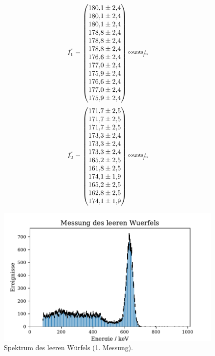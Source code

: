 \begin{equation}
	\vec{I_1}=
	\begin{pmatrix}
		\num{180.1 \pm 2.4} \\
		\num{180.1 \pm 2.4} \\
		\num{180.1\pm 2.4} \\
		\num{178.8\pm 2.4} \\
		\num{178.8\pm 2.4} \\
		\num{178.8\pm 2.4} \\
		\num{176.6\pm 2.4} \\
		\num{177.0\pm 2.4} \\
		\num{175.9\pm 2.4} \\
    \num{176.6\pm 2.4} \\
    \num{177.0\pm 2.4} \\
    \num{175.9\pm 2.4} \\
	\end{pmatrix}
    \sfrac{\text{counts}}{\text{s}}
	\label{eq:vecleer1}
\end{equation}
\begin{equation}
	\vec{I_2}=
	\begin{pmatrix}
		\num{171.7 \pm 2.5} \\
		\num{171.7 \pm 2.5} \\
		\num{171.7\pm 2.5} \\
		\num{173.3\pm 2.4} \\
		\num{173.3\pm 2.4} \\
		\num{173.3\pm 2.4} \\
		\num{165.2\pm 2.5} \\
		\num{161.8\pm 2.5} \\
		\num{174.1\pm 1.9} \\
    \num{165.2\pm 2.5} \\
    \num{162.8\pm 2.5} \\
    \num{174.1\pm 1.9} \\
	\end{pmatrix}
    \sfrac{\text{counts}}{\text{s}}
	\label{eq:vecleer2}
\end{equation}
\begin{figure}[H]
  \centering
  \includegraphics{plots/Alu_leer.pdf}
  \caption{Spektrum des leeren Würfels (1. Messung).}
  \label{Alukasten1}
\end{figure}
